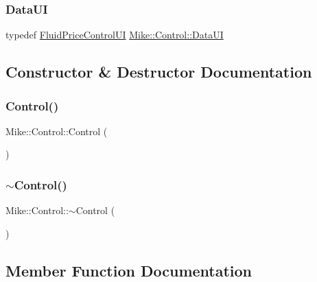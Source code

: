\subsubsection{\texorpdfstring{Data\+UI}{DataUI}}
{\footnotesize\ttfamily typedef \hyperlink{class_fluid_price_control_u_i}{Fluid\+Price\+Control\+UI} \hyperlink{class_mike_1_1_control_addbe39ef40982f0a4002b6f74091a799}{Mike\+::\+Control\+::\+Data\+UI}\hspace{0.3cm}{\ttfamily [private]}}



\subsection{Constructor \& Destructor Documentation}
\mbox{\label{class_mike_1_1_control_ac9a2e3b56773b1eadab7297327a9fbcc}} 
\subsubsection{\texorpdfstring{Control()}{Control()}}
{\footnotesize\ttfamily Mike\+::\+Control\+::\+Control (\begin{DoxyParamCaption}{ }\end{DoxyParamCaption})}

\mbox{\label{class_mike_1_1_control_aa3395e0509ab5b980732ab0e3a29ce4d}} 
\subsubsection{\texorpdfstring{$\sim$\+Control()}{~Control()}}
{\footnotesize\ttfamily Mike\+::\+Control\+::$\sim$\+Control (\begin{DoxyParamCaption}{ }\end{DoxyParamCaption})}



\subsection{Member Function Documentation}
\mbox{\label{class_mike_1_1_control_a3440083f03f7da3d4490fa44bc13d62b}} 
